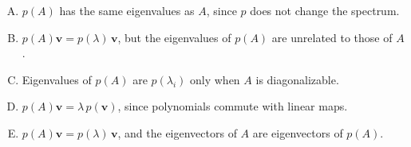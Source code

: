\documentclass[12pt]{amsart}
\begin{document}
\begin{enumerate}[(A)]
\item $p(A)$ has the same eigenvalues as $A$, since $p$ does not change the spectrum.
\item $p(A)\mathbf{v} = p(\lambda)\,\mathbf{v}$, but the eigenvalues of $p(A)$ are unrelated to those of $A$.
\item Eigenvalues of $p(A)$ are $p(\lambda_i)$ only when $A$ is diagonalizable.
\item $p(A)\mathbf{v} = \lambda\, p(\mathbf{v})$, since polynomials commute with linear maps.
\item $p(A)\mathbf{v} = p(\lambda)\,\mathbf{v}$, and the eigenvectors of $A$ are eigenvectors of $p(A)$.
\end{enumerate}

%
%
%
%
\end{document}
